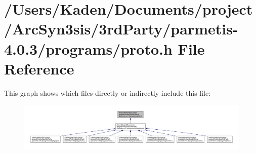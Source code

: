 \hypertarget{a00954}{}\section{/\+Users/\+Kaden/\+Documents/project/\+Arc\+Syn3sis/3rd\+Party/parmetis-\/4.0.3/programs/proto.h File Reference}
\label{a00954}
This graph shows which files directly or indirectly include this file\+:\nopagebreak
\begin{figure}[H]
\begin{center}
\leavevmode
\includegraphics[width=350pt]{a00956}
\end{center}
\end{figure}
